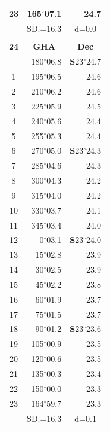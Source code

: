 \documentclass[10pt, a4paper]{report}
\begin{document}
\begin{scriptsize}
\begin{tabular*}{0.2\textwidth}[t]{@{\extracolsep{\fill}}|c|rr|}
23 & 165$^\circ$07.1 & 24.7\\
\hline
\rule{0pt}{2.4ex} & \multicolumn{1}{c}{SD.=16.3} & \multicolumn{1}{c|}{d=0.0}\\
\hline
\multicolumn{1}{c}{}\\[-0.5ex]\hline
\multicolumn{1}{|c|}{\rule{0pt}{2.6ex}\textbf{24}} & \multicolumn{1}{c}{\textbf{GHA}} & \multicolumn{1}{c|}{\textbf{Dec}}\\
\hline\rule{0pt}{2.6ex}\noindent
0 & 180$^\circ$06.8 & \textbf{S}23$^\circ$24.7\\
1 & 195$^\circ$06.5 & 24.6\\
2 & 210$^\circ$06.2 & 24.6\\
3 & 225$^\circ$05.9 & \raisebox{0.24ex}{\boldmath$\cdot$~\boldmath$\cdot$~~}24.5\\
4 & 240$^\circ$05.6 & 24.4\\
5 & 255$^\circ$05.3 & 24.4\\[2Pt]
6 & 270$^\circ$05.0 & \textbf{S}23$^\circ$24.3\\
7 & 285$^\circ$04.6 & 24.3\\
8 & 300$^\circ$04.3 & 24.2\\
9 & 315$^\circ$04.0 & \raisebox{0.24ex}{\boldmath$\cdot$~\boldmath$\cdot$~~}24.2\\
10 & 330$^\circ$03.7 & 24.1\\
11 & 345$^\circ$03.4 & 24.0\\[2Pt]
12 & 0$^\circ$03.1 & \textbf{S}23$^\circ$24.0\\
13 & 15$^\circ$02.8 & 23.9\\
14 & 30$^\circ$02.5 & 23.9\\
15 & 45$^\circ$02.2 & \raisebox{0.24ex}{\boldmath$\cdot$~\boldmath$\cdot$~~}23.8\\
16 & 60$^\circ$01.9 & 23.7\\
17 & 75$^\circ$01.5 & 23.7\\[2Pt]
18 & 90$^\circ$01.2 & \textbf{S}23$^\circ$23.6\\
19 & 105$^\circ$00.9 & 23.5\\
20 & 120$^\circ$00.6 & 23.5\\
21 & 135$^\circ$00.3 & \raisebox{0.24ex}{\boldmath$\cdot$~\boldmath$\cdot$~~}23.4\\
22 & 150$^\circ$00.0 & 23.3\\
23 & 164$^\circ$59.7 & 23.3\\
\hline
\rule{0pt}{2.4ex} & \multicolumn{1}{c}{SD.=16.3} & \multicolumn{1}{c|}{d=0.1}\\
\hline
\end{tabular*}\noindent

\end{scriptsize}
\end{document}

